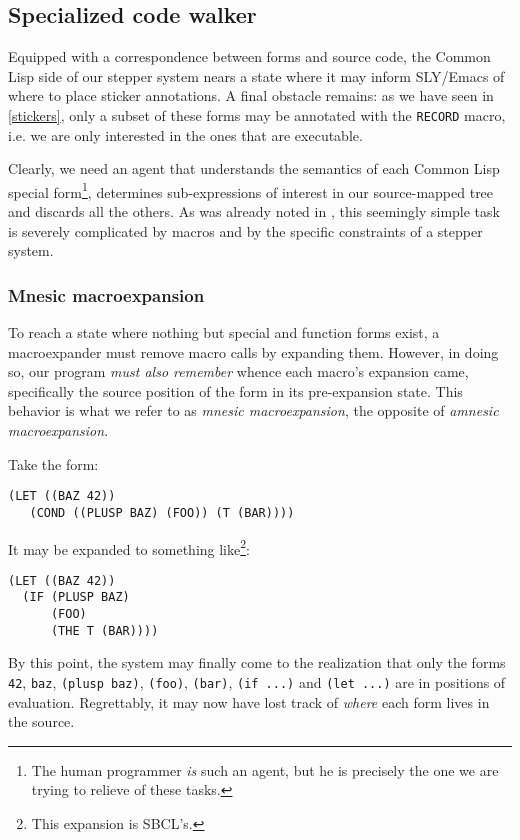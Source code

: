 \documentclass[sigconf]{acmart}
\begin{document}
\subsection{Specialized code walker}

Equipped with a correspondence between forms and source code, the
Common Lisp side of our stepper system nears a state where it may
inform SLY/Emacs of where to place sticker annotations.  A final
obstacle remains: as we have seen in \ref{stickers}, only a subset of
these forms may be annotated with the \texttt{RECORD} macro, i.e. we
are only interested in the ones that are executable.

Clearly, we need an agent that understands the semantics of each
Common Lisp special form\footnote{The human programmer \emph{is} such
  an agent, but he is precisely the one we are trying to relieve of
  these tasks.}, determines sub-expressions of interest in our
source-mapped tree and discards all the others.  As was already noted
in \cite{annotation-based}, this seemingly simple task is severely
complicated by macros and by the specific constraints of a stepper
system.

\subsubsection{Mnesic macroexpansion}

To reach a state where nothing but special and function forms exist, a
macroexpander must remove macro calls by expanding them.  However, in
doing so, our program \emph{must also remember} whence each macro's
expansion came, specifically the source position of the form in its
pre-expansion state.  This behavior is what we refer to as
\emph{mnesic macroexpansion}, the opposite of \emph{amnesic
  macroexpansion}.

Take the form:

\begin{verbatim}
(LET ((BAZ 42))
   (COND ((PLUSP BAZ) (FOO)) (T (BAR))))
\end{verbatim}

It may be expanded to something like\footnote{This expansion is
  SBCL's.}:

\begin{verbatim}
(LET ((BAZ 42))
  (IF (PLUSP BAZ)
      (FOO)
      (THE T (BAR))))
\end{verbatim}

By this point, the system may finally come to the realization that
only the forms \texttt{42}, \texttt{baz}, \texttt{(plusp baz)},
\texttt{(foo)}, \texttt{(bar)}, \texttt{(if ...)} and \texttt{(let
  ...)} are in positions of evaluation.  Regrettably, it may now have
lost track of \emph{where} each form lives in the source.
\end{document}
